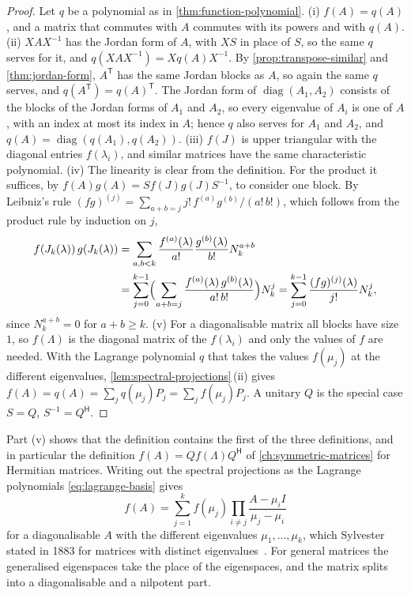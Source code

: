 \begin{proof}
Let $q$ be a polynomial as in \cref{thm:function-polynomial}. (i) $f(A)=q(A)$, and a matrix that commutes with $A$ commutes with its powers and with $q(A)$. (ii) $XAX^{-1}$ has the Jordan form of $A$, with $XS$ in place of $S$, so the same $q$ serves for it, and $q(XAX^{-1})=Xq(A)X^{-1}$. By \cref{prop:transpose-similar} and \cref{thm:jordan-form}, $A^{\mathsf T}$ has the same Jordan blocks as $A$, so again the same $q$ serves, and $q(A^{\mathsf T})=q(A)^{\mathsf T}$. The Jordan form of $\operatorname{diag}(A_1,A_2)$ consists of the blocks of the Jordan forms of $A_1$ and $A_2$, so every eigenvalue of $A_i$ is one of $A$, with an index at most its index in $A$; hence $q$ also serves for $A_1$ and $A_2$, and $q(A)=\operatorname{diag}(q(A_1),q(A_2))$. (iii) $f(J)$ is upper triangular with the diagonal entries $f(\lambda_i)$, and similar matrices have the same characteristic polynomial. (iv) The linearity is clear from the definition. For the product it suffices, by $f(A)g(A)=Sf(J)g(J)S^{-1}$, to consider one block. By Leibniz's rule $(fg)^{(j)}=\sum_{a+b=j}j!\,f^{(a)}g^{(b)}/(a!\,b!)$, which follows from the product rule by induction on $j$,
\[
\begin{aligned}
f(J_k(\lambda))\,g(J_k(\lambda))&=\sum_{a,b<k}\frac{f^{(a)}(\lambda)}{a!}\frac{g^{(b)}(\lambda)}{b!}N_k^{a+b}\\
&=\sum_{j=0}^{k-1}\Bigl(\sum_{a+b=j}\frac{f^{(a)}(\lambda)\,g^{(b)}(\lambda)}{a!\,b!}\Bigr)N_k^j=\sum_{j=0}^{k-1}\frac{(fg)^{(j)}(\lambda)}{j!}N_k^j ,
\end{aligned}
\]
since $N_k^{a+b}=0$ for $a+b\ge k$. (v) For a diagonalisable matrix all blocks have size $1$, so $f(\Lambda)$ is the diagonal matrix of the $f(\lambda_i)$ and only the values of $f$ are needed. With the Lagrange polynomial $q$ that takes the values $f(\mu_j)$ at the different eigenvalues, \cref{lem:spectral-projections}\,(ii) gives $f(A)=q(A)=\sum_jq(\mu_j)P_j=\sum_jf(\mu_j)P_j$. A unitary $Q$ is the special case $S=Q$, $S^{-1}=Q^{\mathsf H}$.
\end{proof}

Part (v) shows that the definition contains the first of the three definitions, and in particular the definition $f(A)=Qf(\Lambda)Q^{\mathsf H}$ of \cref{ch:symmetric-matrices} for Hermitian matrices. Writing out the spectral projections as the Lagrange polynomials \eqref{eq:lagrange-basis} gives 
\[
f(A)=\sum_{j=1}^kf(\mu_j)\prod_{i\ne j}\frac{A-\mu_iI}{\mu_j-\mu_i}
\]
for a diagonalisable $A$ with the different eigenvalues $\mu_1,\ldots,\mu_k$, which Sylvester stated in 1883 for matrices with distinct eigenvalues~\cite{sylvester1883}. For general matrices the generalised eigenspaces take the place of the eigenspaces, and the matrix splits into a diagonalisable and a nilpotent part.

